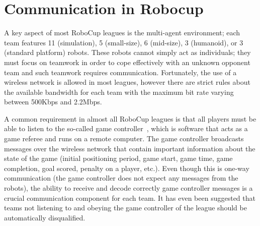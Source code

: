\section{Communication in Robocup}

A key aspect of most RoboCup leagues is the multi-agent environment; each team features 11 (simulation), 5 (small-size), 6 (mid-size), 3 (humanoid), or 3 (standard platform) robots. These robots cannot simply act as individuals; they must focus on teamwork in order to cope effectively with an unknown opponent team and such teamwork requires communication. Fortunately, the use of a wireless network is allowed in most leagues, however there are strict rules about the available bandwidth for each team with the maximum bit rate varying between 500Kbps and 2.2Mbps.  

A common requirement in almost all RoboCup leagues is that all players must be able to listen to the so-called game controller~\cite{robocupgc}, which is software that acts as a game referee and runs on a remote computer. The game controller broadcasts messages over the wireless network that contain important information about the state of the game (initial positioning period, game start, game time, game completion, goal scored, penalty on a player, etc.). Even
though this is one-way communication (the game controller does not expect any messages from the robots), the ability to receive and decode correctly game controller messages is a crucial communication component for each team. It has even been suggested that teams not listening to and obeying the game controller of the league should be automatically disqualified. 

